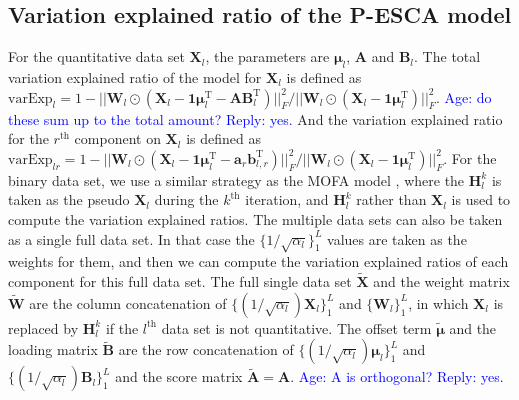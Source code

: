 \subsection{Variation explained ratio of the P-ESCA model}
For the quantitative data set $\mathbf{X}_l$, the parameters are $\bm{\mu}_l$, $\mathbf{A}$ and $\mathbf{B}_l$. The total variation explained ratio of the model for $\mathbf{X}_l$ is defined as $\text{varExp}_{l} = 1 - ||\mathbf{W}_l \odot (\mathbf{X}_l - \mathbf{1} \bm{\mu}_l^{\text{T}} - \mathbf{AB}_l^{\text{T}})||_F^2/||\mathbf{W}_l \odot (\mathbf{X}_l - \mathbf{1}\bm{\mu}_l^{\text{T}})||_F^2$. \textcolor{blue}{Age: do these sum up to the total amount? Reply: yes.} And the variation explained ratio for the $r^{\text{th}}$ component on $\mathbf{X}_l$ is defined as $\text{varExp}_{lr} = 1 - ||\mathbf{W}_l \odot (\mathbf{X}_l - \mathbf{1}\bm{\mu}_l^{\text{T}} - \mathbf{a}_r \mathbf{b}_{l,r}^{\text{T}})||_F^2/||\mathbf{W}_l \odot (\mathbf{X}_l - \mathbf{1}\bm{\mu}_l^{\text{T}})||_F^2$. For the binary data set, we use a similar strategy as the MOFA model \cite{argelaguet2018multi}, where the $\mathbf{H}_{l}^k$ is taken as the pseudo $\mathbf{X}_l$ during the $k^{\text{th}}$ iteration, and $\mathbf{H}_{l}^k$ rather than $\mathbf{X}_l$ is used to compute the variation explained ratios. The multiple data sets can also be taken as a single full data set. In that case the $\{1/\sqrt{\alpha_l} \}_{1}^{L}$ values are taken as the weights for them, and then we can compute the variation explained ratios of each component for this full data set. The full single data set $\widetilde{\mathbf{X}}$ and the weight matrix $\widetilde{\mathbf{W}}$ are the column concatenation of $\{(1/\sqrt{\alpha_l}) \mathbf{X}_l \}_{1}^{L}$ and $\{ \mathbf{W}_l \}_{1}^{L}$, in which $\mathbf{X}_l$ is replaced by $\mathbf{H}^{k}_l$ if the $l^{\text{th}}$ data set is not quantitative. The offset term $\widetilde{\bm{\mu}}$ and the loading matrix $\widetilde{\mathbf{B}}$ are the row concatenation of $\{ (1/\sqrt{\alpha_l}) \bm{\mu}_l \}_{1}^{L}$ and $\{ (1/\sqrt{\alpha_l}) \mathbf{B}_l \}_{1}^{L}$ and the score matrix $\widetilde{\mathbf{A}} = \mathbf{A}$. \textcolor{blue}{Age: A is orthogonal? Reply: yes.}


